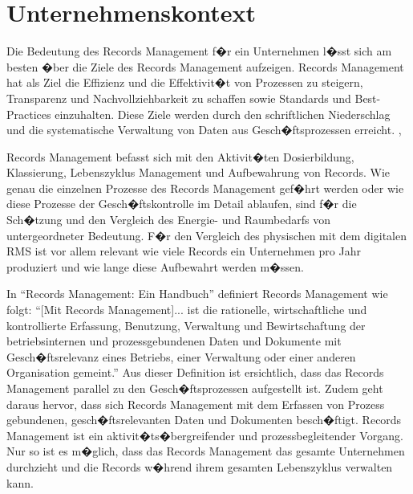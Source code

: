 \documentclass[a4paper,twoside,10pt]{report}
\begin{document}
\section{Unternehmenskontext}\label{rmDef}
Die Bedeutung des Records Management f�r ein Unternehmen l�sst sich am besten �ber die Ziele des Records Management aufzeigen. Records Management hat als Ziel die Effizienz und die Effektivit�t von Prozessen zu steigern, Transparenz und Nachvollziehbarkeit zu schaffen sowie Standards und Best-Practices einzuhalten. Diese Ziele werden durch den schriftlichen Niederschlag und die systematische Verwaltung von Daten aus Gesch�ftsprozessen erreicht. \cite{rmHandbook}, \cite{rmGest}

Records Management befasst sich mit den Aktivit�ten Dosierbildung, Klassierung, Lebenszyklus Management und Aufbewahrung von Records. Wie genau die einzelnen Prozesse des Records Management gef�hrt werden oder wie diese Prozesse der Gesch�ftskontrolle im Detail ablaufen, sind f�r die Sch�tzung und den Vergleich des Energie- und Raumbedarfs von untergeordneter Bedeutung. F�r den Vergleich des physischen mit dem digitalen \ac{RMS} ist vor allem relevant wie viele Records ein Unternehmen pro Jahr produziert und wie lange diese Aufbewahrt werden m�ssen. \cite{rmHandbook}


In "`Records Management: Ein Handbuch"' definiert \citeauthor{rmHandbook} Records Management wie folgt: "`[Mit Records Management]... ist die rationelle, wirtschaftliche und kontrollierte Erfassung, Benutzung, Verwaltung und Bewirtschaftung der betriebsinternen und prozessgebundenen Daten und Dokumente mit Gesch�ftsrelevanz eines Betriebs, einer Verwaltung oder einer anderen Organisation gemeint."' Aus dieser Definition ist ersichtlich, dass das Records Management parallel zu den Gesch�ftsprozessen aufgestellt ist. Zudem geht daraus hervor, dass sich Records Management mit dem Erfassen von Prozess gebundenen, gesch�ftsrelevanten Daten und Dokumenten besch�ftigt. Records Management ist ein aktivit�ts�bergreifender und prozessbegleitender Vorgang. Nur so ist es m�glich, dass das Records Management das gesamte Unternehmen durchzieht und die Records w�hrend ihrem gesamten Lebenszyklus verwalten kann. \cite{rmGest}
\end{document}
